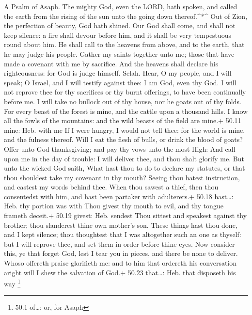 A Psalm of Asaph.  The mighty God, even the LORD, hath
spoken, and called the earth from the rising of the sun unto the going
down thereof.\^{}*\^{}  Out of Zion, the perfection of
beauty, God hath shined.  Our God shall come, and shall not
keep silence: a fire shall devour before him, and it shall be very
tempestuous round about him.  He shall call to the heavens
from above, and to the earth, that he may judge his people. 
Gather my saints together unto me; those that have made a covenant with
me by sacrifice.  And the heavens shall declare his
righteousness: for God is judge himself. Selah.  Hear, O my
people, and I will speak; O Israel, and I will testify against thee: I
am God, even thy God.  I will not reprove thee for thy
sacrifices or thy burnt offerings, to have been continually before me.
 I will take no bullock out of thy house, nor he goats out
of thy folds.  For every beast of the forest is mine, and
the cattle upon a thousand hills.  I know all the fowls of
the mountains: and the wild beasts of the field are mine.+ 50.11 mine:
Heb. with me  If I were hungry, I would not tell thee: for
the world is mine, and the fulness thereof.  Will I eat the
flesh of bulls, or drink the blood of goats?  Offer unto
God thanksgiving; and pay thy vows unto the most High:  And
call upon me in the day of trouble: I will deliver thee, and thou shalt
glorify me.  But unto the wicked God saith, What hast thou
to do to declare my statutes, or that thou shouldest take my covenant in
thy mouth?  Seeing thou hatest instruction, and castest my
words behind thee.  When thou sawest a thief, then thou
consentedst with him, and hast been partaker with adulterers.+ 50.18
hast\ldots: Heb. thy portion was with  Thou givest thy
mouth to evil, and thy tongue frameth deceit.+ 50.19 givest: Heb.
sendest  Thou sittest and speakest against thy brother;
thou slanderest thine own mother's son.  These things hast
thou done, and I kept silence; thou thoughtest that I was altogether
such an one as thyself: but I will reprove thee, and set them in order
before thine eyes.  Now consider this, ye that forget God,
lest I tear you in pieces, and there be none to deliver. 
Whoso offereth praise glorifieth me: and to him that ordereth his
conversation aright will I shew the salvation of God.+ 50.23 that\ldots:
Heb. that disposeth his way \footnote{50.1 of\ldots: or, for Asaph}

